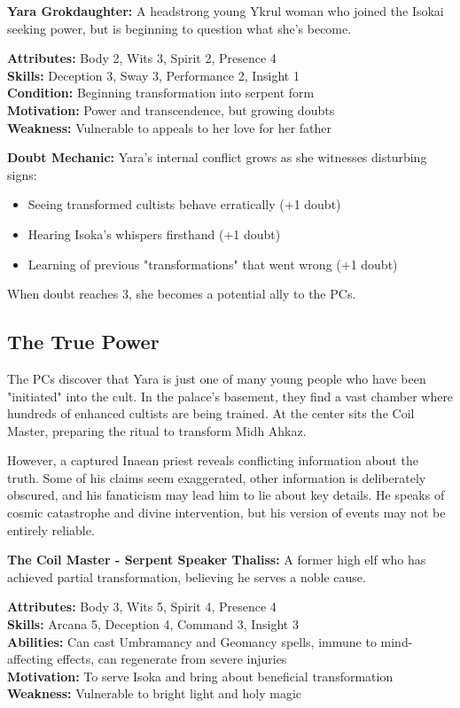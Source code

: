 \documentclass[12pt,twoside]{article}
\begin{document}
\textbf{Yara Grokdaughter:}
A headstrong young Ykrul woman who joined the Isokai seeking power, but is beginning to question what she's become.

\textbf{Attributes:} Body 2, Wits 3, Spirit 2, Presence 4 \\
\textbf{Skills:} Deception 3, Sway 3, Performance 2, Insight 1 \\
\textbf{Condition:} Beginning transformation into serpent form \\
\textbf{Motivation:} Power and transcendence, but growing doubts \\
\textbf{Weakness:} Vulnerable to appeals to her love for her father

\textbf{Doubt Mechanic:} Yara's internal conflict grows as she witnesses disturbing signs:
\begin{itemize}
  \item Seeing transformed cultists behave erratically (+1 doubt)
  \item Hearing Isoka's whispers firsthand (+1 doubt)
  \item Learning of previous "transformations" that went wrong (+1 doubt)
\end{itemize}
When doubt reaches 3, she becomes a potential ally to the PCs.

\subsection{The True Power}

The PCs discover that Yara is just one of many young people who have been "initiated" into the cult. In the palace's basement, they find a vast chamber where hundreds of enhanced cultists are being trained. At the center sits the Coil Master, preparing the ritual to transform Midh Ahkaz.

However, a captured Inaean priest reveals conflicting information about the truth. Some of his claims seem exaggerated, other information is deliberately obscured, and his fanaticism may lead him to lie about key details. He speaks of cosmic catastrophe and divine intervention, but his version of events may not be entirely reliable.

\textbf{The Coil Master - Serpent Speaker Thaliss:}
A former high elf who has achieved partial transformation, believing he serves a noble cause.

\textbf{Attributes:} Body 3, Wits 5, Spirit 4, Presence 4 \\
\textbf{Skills:} Arcana 5, Deception 4, Command 3, Insight 3 \\
\textbf{Abilities:} Can cast Umbramancy and Geomancy spells, immune to mind-affecting effects, can regenerate from severe injuries \\
\textbf{Motivation:} To serve Isoka and bring about beneficial transformation \\
\textbf{Weakness:} Vulnerable to bright light and holy magic
\end{document}
